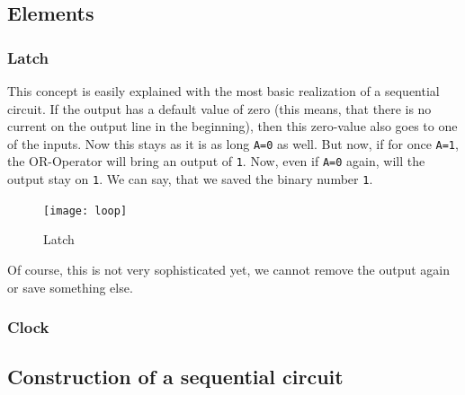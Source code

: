 \subsection{Elements}
\subsubsection{Latch}
This concept is easily explained with the most basic realization of a sequential circuit. If the output has a default value of zero (this means, that there is no current on the output line in the beginning), then this zero-value also goes to one of the inputs. Now this stays as it is as long \texttt{A=0} as well. But now, if for once \texttt{A=1}, the OR-Operator will bring an output of \texttt{1}. Now, even if \texttt{A=0} again, will the output stay on \texttt{1}. We can say, that we saved the binary number \texttt{1}.

\begin{figure}[H]
\centering
  \texttt{[image: loop]}%
  \caption{Latch}%
  \label{fig:loop}
\end{figure}

Of course, this is not very sophisticated yet, we cannot remove the output again or save something else. 

\subsubsection{Clock}
\subsection{Construction of a sequential circuit}
